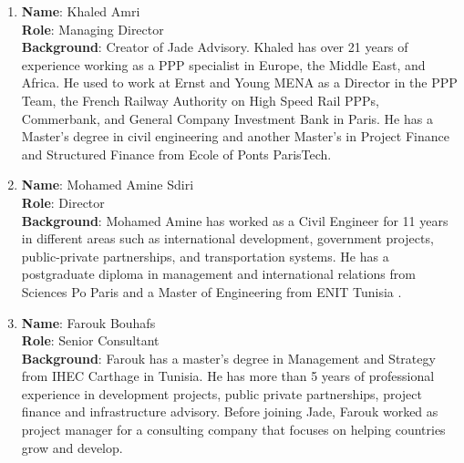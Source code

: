 \begin{enumerate}
    \item \textbf{Name}: Khaled Amri \\
    \textbf{Role}: Managing Director \\
    \textbf{Background}: Creator of Jade Advisory. Khaled has over 21 years of experience working as a PPP specialist in Europe, the Middle East, and Africa. He used to work at Ernst and Young MENA as a Director in the PPP Team, the French Railway Authority on High Speed Rail PPPs, Commerbank, and General Company Investment Bank in Paris. He has a Master's degree in civil engineering and another Master's in Project Finance and Structured Finance from Ecole of Ponts ParisTech.%
    \item \textbf{Name}: Mohamed Amine Sdiri\\
    \textbf{Role}: Director \\
    \textbf{Background}: Mohamed Amine has worked as a Civil Engineer for 11 years in different areas such as international development, government projects, public-private partnerships, and transportation systems. He has a postgraduate diploma in management and international relations from Sciences Po Paris and a Master of Engineering from ENIT Tunisia .%

    \item \textbf{Name}: Farouk Bouhafs \\
    \textbf{Role}: Senior Consultant \\
    \textbf{Background}: Farouk has a master's degree in Management and Strategy from IHEC Carthage in Tunisia. He has more than 5 years of professional experience in development projects, public private partnerships, project finance and infrastructure advisory. Before joining Jade, Farouk worked as project manager for a consulting company that focuses on helping countries grow and develop.%


\end{enumerate}
